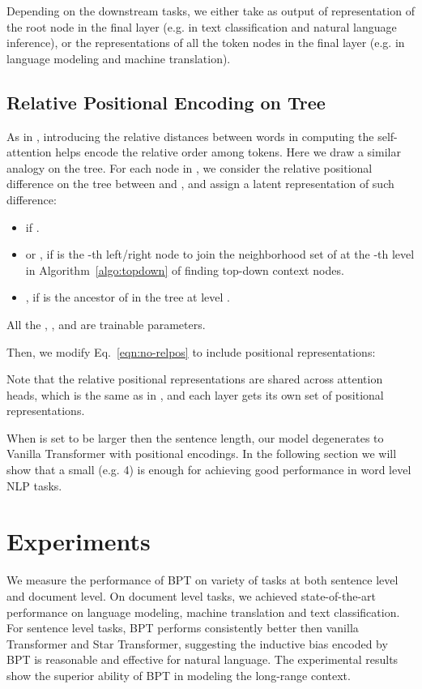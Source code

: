 \documentclass[11pt,a4paper]{article}
\begin{document}
Depending on the downstream tasks, we either take as output of representation of the root node in the final layer (e.g. in text classification and natural language inference), or the representations of all the token nodes in the final layer (e.g. in language modeling and machine translation).

\subsection{Relative Positional Encoding on Tree}

As in \cite{shaw2018self}, introducing the relative distances between words in computing the self-attention helps encode the relative order among tokens.
Here we draw a similar analogy on the tree.
For each node  in , we consider the relative positional difference on the tree between  and , and assign a latent representation  of such difference:

\begin{itemize}
    \item  if .
    \item  or , if  is the -th left/right node to join the neighborhood set of  at the -th level in Algorithm~\ref{algo:topdown} of finding top-down context nodes.
    \item , if  is the ancestor of  in the tree at level .

\end{itemize}

All the , ,  and   are trainable parameters.

Then, we modify Eq.~\eqref{eqn:no-relpos} to include positional representations:

Note that the relative positional representations are shared across attention heads, which is the same as in \cite{shaw2018self}, and each layer gets its own set of positional representations.

When  is set to be larger then the sentence length, our model degenerates to Vanilla Transformer with positional encodings. In the following section we will show that a small  (e.g. 4) is enough for achieving good performance in word level NLP tasks.

\section{Experiments}





We measure the performance of BPT on variety of tasks at both sentence level and document level. On document level tasks, we achieved state-of-the-art performance on language modeling, machine translation and text classification. For sentence level tasks, BPT performs consistently better then vanilla Transformer and Star Transformer, suggesting the inductive bias encoded by BPT is reasonable and effective for natural language.
The experimental results show the superior ability of BPT in modeling the long-range context.
\end{document}
